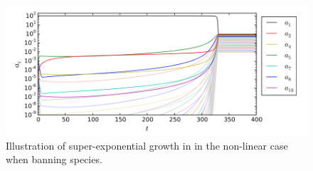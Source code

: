 \documentclass[11pt]{article}
\begin{document}
\begin{figure}[hbt]
  \includegraphics[width=\textwidth]{figures/virgo2016/fig2.png}
  \caption{Illustration of super-exponential growth in \cite{virgo_complex_2016} in the non-linear case when banning species.}
  \label{fig:virgo2016fig2}
\end{figure}


\clearpage

\subsubsection{\texorpdfstring{\cite{walker_universal_2012}}{}}
\end{document}
